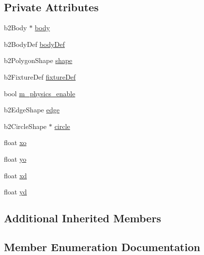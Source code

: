 \subsection*{Private Attributes}
\begin{DoxyCompactItemize}
\item 
b2\+Body $\ast$ \hyperlink{classPhysicsComponent_a643c8078ab0823f37ae62dd98c316b9f}{body}
\item 
b2\+Body\+Def \hyperlink{classPhysicsComponent_ad2f5ffe4163e08e6f16fa222bf633474}{body\+Def}
\item 
b2\+Polygon\+Shape \hyperlink{classPhysicsComponent_a50be8b7da57aec98417b76d4b90973fa}{shape}
\item 
b2\+Fixture\+Def \hyperlink{classPhysicsComponent_aca31f533ae49f60632160d205a1425d4}{fixture\+Def}
\item 
bool \hyperlink{classPhysicsComponent_a660b0c70e486dbb2d0117162eb7a98c4}{m\+\_\+physics\+\_\+enable}
\item 
b2\+Edge\+Shape \hyperlink{classPhysicsComponent_ae30461aa2643259a30a51fee37586a4b}{edge}
\item 
b2\+Circle\+Shape $\ast$ \hyperlink{classPhysicsComponent_a14fd1bdb36beb4e156c96b22780c4cfa}{circle}
\item 
float \hyperlink{classPhysicsComponent_a42f8ac53bfdf5ac224e401a67b69e6d7}{xo}
\item 
float \hyperlink{classPhysicsComponent_a27b23d86202aeb074c099cc948696281}{yo}
\item 
float \hyperlink{classPhysicsComponent_a1aa73375358c6423eb0370c34fb221ca}{xd}
\item 
float \hyperlink{classPhysicsComponent_a50d90cbee9f4abe616e25b9d73922bfb}{yd}
\end{DoxyCompactItemize}
\subsection*{Additional Inherited Members}


\subsection{Member Enumeration Documentation}
\mbox{\label{classPhysicsComponent_aaa3041013e4b2841a99d2f97ba24786f}} 
